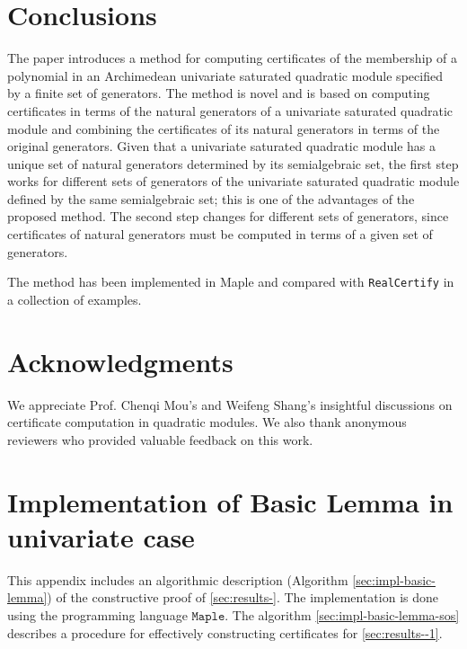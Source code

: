 \documentclass[preprint,12pt,authoryear]{elsarticle}
\newcommand{\maple}{\texttt{Maple}\xspace}
\newcommand{\rc}{\texttt{RealCertify}\xspace}
\begin{document}
 \section{Conclusions} \label{conclusion_sect}

The paper introduces a method for computing certificates of the membership of a
polynomial in an Archimedean univariate saturated quadratic module specified by a
finite set of generators. The method is novel and is based on computing
certificates in terms of the natural generators of a univariate saturated
quadratic module and combining the certificates of its natural generators in
terms of the original generators.  Given that a univariate saturated quadratic
module has a unique set of natural generators determined by its semialgebraic
set, the first step works for different sets of generators of the univariate
saturated quadratic module defined by the same semialgebraic set; this is one
of the advantages of the proposed method.  The second step changes for different
sets of generators, since certificates of natural generators must be computed in
terms of a given set of generators.

The method has been implemented in Maple and compared with \rc in a collection
of examples.

\section{Acknowledgments}
  We appreciate Prof. Chenqi Mou's and Weifeng Shang's insightful discussions on
  certificate computation in quadratic modules. We also thank anonymous
 reviewers who provided valuable feedback on this work.


 


\appendix

\section{Implementation of Basic Lemma in univariate case}
\label{basiclemma-appendix}

This appendix includes an algorithmic description (Algorithm
\ref{sec:impl-basic-lemma}) of the constructive proof of
\th\ref{sec:results-}. The implementation is done using the programming
language $\maple$. The algorithm \ref{sec:impl-basic-lemma-sos} describes a
procedure for effectively constructing certificates for \th\ref{sec:results--1}.
\end{document}
